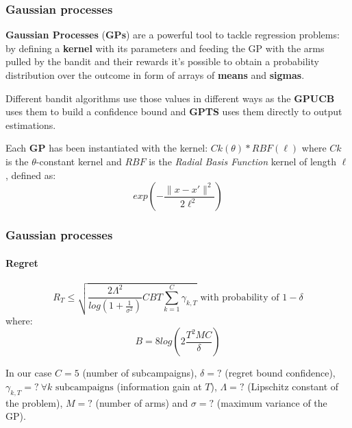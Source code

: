 
\begin{frame}

\frametitle{Gaussian processes}

\textbf{Gaussian Processes} (\textbf{GPs}) are a powerful tool to tackle regression problems: by defining a \textbf{kernel} with its parameters and feeding the GP with the arms pulled by the bandit and their rewards it's possible to obtain a probability distribution over the outcome in form of arrays of \textbf{means} and \textbf{sigmas}.

Different bandit algorithms use those values in different ways as the \textbf{GPUCB} uses them to build a confidence bound and \textbf{GPTS} uses them directly to output estimations.

Each \textbf{GP} has been instantiated with the kernel: $Ck(\theta) * RBF(\ell)$ where $Ck$ is the $\theta$-constant kernel and $RBF$ is the \textit{Radial Basis Function} kernel of length $\ell$, defined as:
\begin{displaymath}
exp \left( - \frac{ \lVert x - x' \rVert^2 }{ 2\ell^2} \right)
\end{displaymath}

\end{frame}


\begin{frame}

\frametitle{Gaussian processes}
\framesubtitle{Regret}

\vspace*{-3em}

\begin{displaymath}
    R_T \le \sqrt{ \frac{2\Lambda^2}{log(1+\frac{1}{\sigma^2})} CBT \sum_{k=1}^C \gamma_{k, T} } \text{ with probability of } 1 - \delta
\end{displaymath}
where:
\begin{displaymath}
    B = 8log\left( 2\frac{T^2MC}{\delta} \right)
\end{displaymath}

In our case $C=5$ (number of subcampaigns), $\delta=?$ (regret bound confidence), $\gamma_{k, T}=? ~\forall k \text{ subcampaigns}$ (information gain at $T$), $\Lambda=?$ (Lipschitz constant of the problem), $M=?$ (number of arms) and $\sigma=?$ (maximum variance of the GP).


\end{frame}

